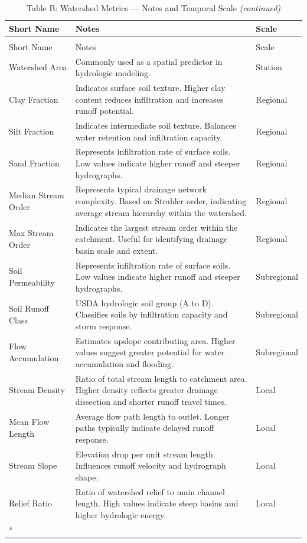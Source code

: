 \documentclass[
  10pt,
]{article}
\begin{document}
\vspace{0.5cm}

\begingroup\fontsize{8}{10}\selectfont

\begin{longtable}[t]{lp{8cm}l}
\caption{\label{tab:create_tables}Table B: Watershed Metrics — Notes and Temporal Scale}\\
\toprule
Short Name & Notes & Scale\\
\midrule
\endfirsthead
\caption[]{Table B: Watershed Metrics — Notes and Temporal Scale \textit{(continued)}}\\
\toprule
Short Name & Notes & Scale\\
\midrule
\endhead

\endfoot
\bottomrule
\endlastfoot
Watershed Area & Commonly used as a spatial predictor in hydrologic modeling. & Station\\
Clay Fraction & Indicates surface soil texture. Higher clay content reduces
infiltration and increases runoff potential. & Regional\\
Silt Fraction & Indicates intermediate soil texture. Balances water retention and
infiltration capacity. & Regional\\
Sand Fraction & Represents infiltration rate of surface soils. Low values indicate
higher runoff and steeper hydrographs. & Regional\\
Median Stream Order & Represents typical drainage network complexity. Based on Strahler
order, indicating average stream hierarchy within the watershed. & Regional\\
\addlinespace
Max Stream Order & Indicates the largest stream order within the catchment. Useful for
identifying drainage basin scale and extent. & Regional\\
Soil Permeability & Represents infiltration rate of surface soils. Low values indicate
higher runoff and steeper hydrographs. & Subregional\\
Soil Runoff Class & USDA hydrologic soil group (A to D). Classifies soils by infiltration
capacity and storm response. & Subregional\\
Flow Accumulation & Estimates upslope contributing area. Higher values suggest greater
potential for water accumulation and flooding. & Subregional\\
Stream Density & Ratio of total stream length to catchment area. Higher density
reflects greater drainage dissection and shorter runoff travel times. & Local\\
\addlinespace
Mean Flow Length & Average flow path length to outlet. Longer paths typically indicate
delayed runoff response. & Local\\
Stream Slope & Elevation drop per unit stream length. Influences runoff velocity and
hydrograph shape. & Local\\
Relief Ratio & Ratio of watershed relief to main channel length. High values indicate
steep basins and higher hydrologic energy. & Local\\*
\end{longtable}
\endgroup{}
\end{document}
